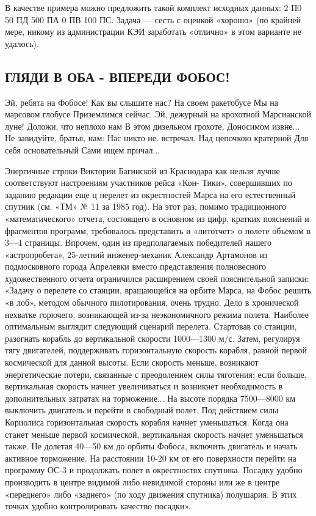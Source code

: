 \documentclass[11pt,a4paper,oneside]{article}
\begin{document}
В качестве примера можно предложить такой комплект исходных данных: 2 П0 50 ПД 500 ПА 0 ПВ 100 ПС. Задача — сесть с оценкой «хорошо» (по крайней мере, никому из администрации КЭИ заработать «отлично» в этом варианте не удалось).

\subsection{ГЛЯДИ В ОБА - ВПЕРЕДИ ФОБОС!}
Эй, ребята на Фобосе!
Как вы слышите нас?
На своем ракетобусе Мы на марсовом глобусе Приземлимся сейчас.
Эй, дежурный на крохотной Марсианской луне!
Доложи, что неплохо нам В этом дизельном грохоте,
Доносимом извне...
Не завидуйте, братья, нам:
Нас никто не. встречал.
Над цепочкою кратерной Для себя основательный Сами ищем причал...

Энергичные строки Виктории Багинской из Краснодара как нельзя лучше соответствуют настроениям участников рейса «Кон- Тики», совершивших по заданию редакции еще ц перелет из окрестностей Марса на его естественный спутник (см. «ТМ» №	11 за
1985 год). На этот раз, помимо традиционного «математического» отчета, состоящего в основном из цифр, кратких пояснений и фрагментов программ, требовалось представить и «литотчет» о полете объемом в 3—4 страницы. Впрочем, один из предполагаемых победителей нашего «астропробега», 25-летний инженер-механик Александр Артамонов из подмосковного города Апрелевки вместо представления полновесного художественного отчета ограничился расширением своей пояснительной записки: «Задачу о перелете со станции, вращающейся на орбите Марса, на Фобос решить «в лоб», методом обычного пилотирования, очень трудно. Дело в хронической нехватке горючего, возникающей из-за неэкономичного режима полета. Наиболее оптимальным выглядит следующий сценарий перелета. Стартовав со станции, разогнать корабль до вертикальной скорости 1000—1300 м/с. Затем, регулируя тягу двигателей, поддерживать горизонтальную скорость корабля, равной первой космической для данной высоты. Если скорость меньше, возникают энергетические потери, связанные с преодолением силы тяготения; если больше, вертикальная скорость начнет увеличиваться и возникнет необходимость в дополнительных затратах на торможение... На высоте порядка 7500—8000 км выключить двигатель и перейти в свободный полет. Под действием силы Кориолиса горизонтальная скорость корабля начнет уменьшаться. Когда она станет меньше первой космической, вертикальная скорость начнет уменьшаться также. Не долетая 40—50 км до орбиты Фобоса, включить двигатель и начать активное торможение. На расстоянии 10-20 км от его поверхности перейти на программу ОС-3 и продолжать полет в окрестностях спутника. Посадку удобно производить в центре видимой либо невидимой стороны или же в центре «переднего» либо «заднего» (по ходу движения спутника) полушария. В этих точках удобно контролировать качество посадки».
\end{document}
